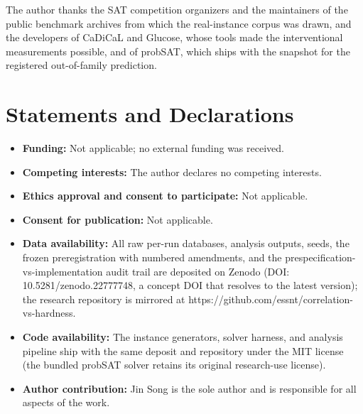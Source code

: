 \documentclass[pdflatex,sn-basic,Numbered]{sn-jnl}
\begin{document}

The author thanks the SAT competition organizers and the maintainers of the
public benchmark archives from which the real-instance corpus was drawn, and
the developers of CaDiCaL and Glucose, whose tools made the interventional
measurements possible, and of probSAT, which ships with the snapshot for the
registered out-of-family prediction.

\section*{Statements and Declarations}

\begin{itemize}
\item \textbf{Funding:} Not applicable; no external funding was received.
\item \textbf{Competing interests:} The author declares no competing interests.
\item \textbf{Ethics approval and consent to participate:} Not applicable.
\item \textbf{Consent for publication:} Not applicable.
\item \textbf{Data availability:} All raw per-run databases, analysis outputs,
seeds, the frozen preregistration with numbered amendments, and the
prespecification-vs-implementation audit trail are deposited on Zenodo (DOI:
10.5281/zenodo.22777748, a concept DOI that resolves to the latest version);
the research repository is mirrored at
https://github.com/essnt/correlation-vs-hardness.
\item \textbf{Code availability:} The instance generators, solver harness,
and analysis pipeline ship with the same deposit and repository under the MIT
license (the bundled probSAT solver retains its original research-use
license).
\item \textbf{Author contribution:} Jin Song is the sole author and is
responsible for all aspects of the work.
\end{itemize}
\end{document}
